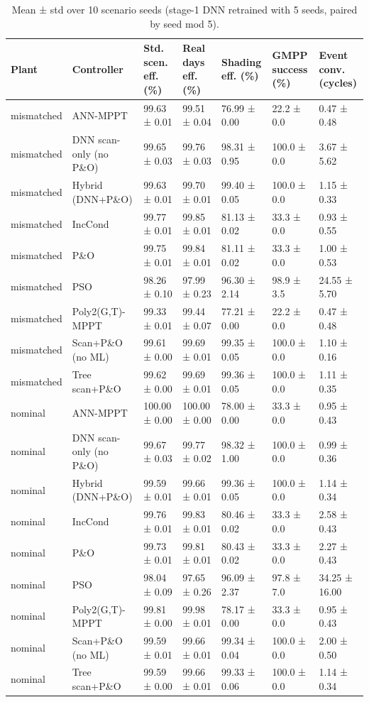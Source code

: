 \begin{table}[t]
\centering
\caption{Mean ± std over 10 scenario seeds (stage-1 DNN retrained with 5 seeds, paired by seed mod 5).}
\label{tab:Table_Stats}
\small
\begin{tabular}{lllllll}
\hline
Plant & Controller & Std. scen. eff. (\%) & Real days eff. (\%) & Shading eff. (\%) & GMPP success (\%) & Event conv. (cycles) \\
\hline
mismatched & ANN-MPPT & 99.63 ± 0.01 & 99.51 ± 0.04 & 76.99 ± 0.00 & 22.2 ± 0.0 & 0.47 ± 0.48 \\
mismatched & DNN scan-only (no P\&O) & 99.65 ± 0.03 & 99.76 ± 0.03 & 98.31 ± 0.95 & 100.0 ± 0.0 & 3.67 ± 5.62 \\
mismatched & Hybrid (DNN+P\&O) & 99.63 ± 0.01 & 99.70 ± 0.01 & 99.40 ± 0.05 & 100.0 ± 0.0 & 1.15 ± 0.33 \\
mismatched & IncCond & 99.77 ± 0.01 & 99.85 ± 0.01 & 81.13 ± 0.02 & 33.3 ± 0.0 & 0.93 ± 0.55 \\
mismatched & P\&O & 99.75 ± 0.01 & 99.84 ± 0.01 & 81.11 ± 0.02 & 33.3 ± 0.0 & 1.00 ± 0.53 \\
mismatched & PSO & 98.26 ± 0.10 & 97.99 ± 0.23 & 96.30 ± 2.14 & 98.9 ± 3.5 & 24.55 ± 5.70 \\
mismatched & Poly2(G,T)-MPPT & 99.33 ± 0.01 & 99.44 ± 0.07 & 77.21 ± 0.00 & 22.2 ± 0.0 & 0.47 ± 0.48 \\
mismatched & Scan+P\&O (no ML) & 99.61 ± 0.00 & 99.69 ± 0.01 & 99.35 ± 0.05 & 100.0 ± 0.0 & 1.10 ± 0.16 \\
mismatched & Tree scan+P\&O & 99.62 ± 0.00 & 99.69 ± 0.01 & 99.36 ± 0.05 & 100.0 ± 0.0 & 1.11 ± 0.35 \\
nominal & ANN-MPPT & 100.00 ± 0.00 & 100.00 ± 0.00 & 78.00 ± 0.00 & 33.3 ± 0.0 & 0.95 ± 0.43 \\
nominal & DNN scan-only (no P\&O) & 99.67 ± 0.03 & 99.77 ± 0.02 & 98.32 ± 1.00 & 100.0 ± 0.0 & 0.99 ± 0.36 \\
nominal & Hybrid (DNN+P\&O) & 99.59 ± 0.01 & 99.66 ± 0.01 & 99.36 ± 0.05 & 100.0 ± 0.0 & 1.14 ± 0.34 \\
nominal & IncCond & 99.76 ± 0.01 & 99.83 ± 0.01 & 80.46 ± 0.02 & 33.3 ± 0.0 & 2.58 ± 0.43 \\
nominal & P\&O & 99.73 ± 0.01 & 99.81 ± 0.01 & 80.43 ± 0.02 & 33.3 ± 0.0 & 2.27 ± 0.43 \\
nominal & PSO & 98.04 ± 0.09 & 97.65 ± 0.26 & 96.09 ± 2.37 & 97.8 ± 7.0 & 34.25 ± 16.00 \\
nominal & Poly2(G,T)-MPPT & 99.81 ± 0.00 & 99.98 ± 0.01 & 78.17 ± 0.00 & 33.3 ± 0.0 & 0.95 ± 0.43 \\
nominal & Scan+P\&O (no ML) & 99.59 ± 0.01 & 99.66 ± 0.01 & 99.34 ± 0.04 & 100.0 ± 0.0 & 2.00 ± 0.50 \\
nominal & Tree scan+P\&O & 99.59 ± 0.00 & 99.66 ± 0.01 & 99.33 ± 0.06 & 100.0 ± 0.0 & 1.14 ± 0.34 \\
\hline
\end{tabular}
\end{table}
